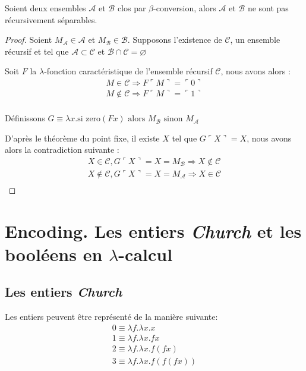 \begin{theoreme}
Soient deux ensembles $\mathcal{A}$ et $\mathcal{B}$ clos par $\beta$-conversion, alors 
$\mathcal{A}$ et $\mathcal{B}$ ne sont pas récursivement séparables.	
\end{theoreme}

\begin{proof}
	Soient $M_\mathcal{A} \in \mathcal{A}$ et  $M_\mathcal{B} \in \mathcal{B}$.
	Supposons l'existence de $\mathcal{C}$, un ensemble récursif et tel que 
	$\mathcal{A} \subset \mathcal{C}$ et $\mathcal{B} \cap \mathcal{C} = \varnothing$
	
	Soit $F$ la $\lambda$-fonction caractéristique de l'ensemble récursif $\mathcal{C}$,
	nous avons alors :
	\begin{align*}
		M \in \mathcal{C} \Rightarrow F \ulcorner M \urcorner = \ulcorner 0 \urcorner \\
		M \notin \mathcal{C} \Rightarrow F \ulcorner M \urcorner = \ulcorner 1 \urcorner \\
	\end{align*}
	
	Définissons $G \equiv \lambda x.\text{si\ zero}(Fx) \text{\ alors\ } M_\mathcal{B}
	\text{\ sinon\ } M_\mathcal{A}$

	D'après le théorème du point fixe, il existe $X$ tel que $G\ulcorner X \urcorner = X$,
	nous avons alors la contradiction suivante :
	\begin{align*}
		X \in \mathcal{C}, G \ulcorner X \urcorner = X = M_\mathcal{B} \Rightarrow X \notin \mathcal{C} \\
		X \notin \mathcal{C}, G \ulcorner X \urcorner = X = M_\mathcal{A} \Rightarrow X \in \mathcal{C} \\
	\end{align*}
\end{proof}
\section{Encoding. Les entiers \textit{Church} et les booléens en $\lambda$-calcul}
\subsection{Les entiers \textit{Church} }
Les entiers peuvent être représenté de la manière suivante:
$$
\begin{array}{l}
0 \equiv \lambda f.\lambda x.x \\
1 \equiv \lambda f.\lambda x.f x \\
2 \equiv \lambda f.\lambda x.f (f x) \\
3 \equiv \lambda f.\lambda x.f (f (f x)) 
\end{array}
$$

